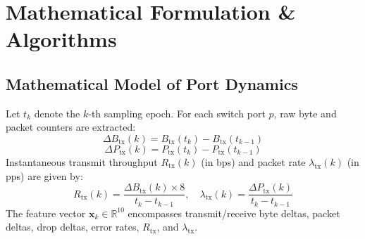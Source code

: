 \documentclass[conference]{IEEEtran}
\begin{document}
\section{Mathematical Formulation \& Algorithms}

\subsection{Mathematical Model of Port Dynamics}
Let $t_k$ denote the $k$-th sampling epoch. For each switch port $p$, raw byte and packet counters are extracted:
\begin{equation}
\Delta B_{\text{tx}}(k) = B_{\text{tx}}(t_k) - B_{\text{tx}}(t_{k-1})
\end{equation}
\begin{equation}
\Delta P_{\text{tx}}(k) = P_{\text{tx}}(t_k) - P_{\text{tx}}(t_{k-1})
\end{equation}
Instantaneous transmit throughput $R_{\text{tx}}(k)$ (in bps) and packet rate $\lambda_{\text{tx}}(k)$ (in pps) are given by:
\begin{equation}
R_{\text{tx}}(k) = \frac{\Delta B_{\text{tx}}(k) \times 8}{t_k - t_{k-1}}, \quad \lambda_{\text{tx}}(k) = \frac{\Delta P_{\text{tx}}(k)}{t_k - t_{k-1}}
\end{equation}
The feature vector $\mathbf{x}_k \in \mathbb{R}^{10}$ encompasses transmit/receive byte deltas, packet deltas, drop deltas, error rates, $R_{\text{tx}}$, and $\lambda_{\text{tx}}$.
\end{document}
